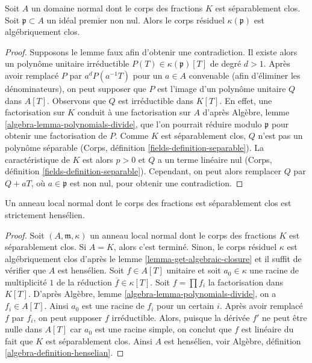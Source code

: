 \begin{lemma}
\label{lemma-get-algebraic-closure}
Soit $A$ un domaine normal dont le corps des fractions $K$ est séparablement
clos. Soit $\mathfrak p \subset A$ un idéal premier non nul.
Alors le corps résiduel $\kappa(\mathfrak p)$ est algébriquement clos.
\end{lemma}

\begin{proof}
Supposons le lemme faux afin d'obtenir une contradiction. Il existe alors un
polynôme unitaire irréductible $P(T) \in \kappa(\mathfrak p)[T]$ de
degré $d > 1$. Après avoir remplacé $P$ par $a^d P(a^{-1}T)$ pour un $a \in A$
convenable (afin d'éliminer les dénominateurs), on peut supposer que $P$ est l'image d'un
polynôme unitaire $Q$ dans $A[T]$. Observons que $Q$ est irréductible dans
$K[T]$. En effet, une factorisation sur $K$ conduit à une factorisation
sur $A$ d'après Algèbre, lemme \ref{algebra-lemma-polynomials-divide},
que l'on pourrait réduire modulo $\mathfrak p$ pour obtenir une factorisation de $P$.
Comme $K$ est séparablement clos, $Q$ n'est pas un polynôme séparable
(Corps, définition \ref{fields-definition-separable}).
La caractéristique de $K$ est alors $p > 0$ et $Q$ a
un terme linéaire nul (Corps, définition \ref{fields-definition-separable}).
Cependant, on peut alors remplacer $Q$ par
$Q + a T$, où $a \in \mathfrak p$ est non nul, pour obtenir une contradiction.
\end{proof}

\begin{lemma}
\label{lemma-normal-local-domain-separablly-closed-fraction-field}
Un anneau local normal dont le corps des fractions est séparablement clos est
strictement hensélien.
\end{lemma}

\begin{proof}
Soit $(A, \mathfrak m, \kappa)$ un anneau local normal dont le corps des fractions
$K$ est séparablement clos. Si $A = K$, alors c'est terminé. Sinon,
le corps résiduel $\kappa$ est algébriquement clos
d'après le lemme \ref{lemma-get-algebraic-closure} et il suffit de
vérifier que $A$ est hensélien.
Soit $f \in A[T]$ unitaire et soit $a_0 \in \kappa$ une racine
de multiplicité $1$ de la réduction $\overline{f} \in \kappa[T]$.
Soit $f = \prod f_i$ la factorisation dans $K[T]$.
D'après Algèbre, lemme \ref{algebra-lemma-polynomials-divide}, on a
$f_i \in A[T]$. Ainsi $a_0$ est une racine de $f_i$ pour un certain $i$.
Après avoir remplacé $f$ par $f_i$, on peut supposer $f$ irréductible.
Alors, puisque la dérivée $f'$ ne peut être nulle dans $A[T]$
car $a_0$ est une racine simple, on conclut que $f$ est linéaire
du fait que $K$ est séparablement clos.
Ainsi $A$ est hensélien, voir
Algèbre, définition \ref{algebra-definition-henselian}.
\end{proof}

